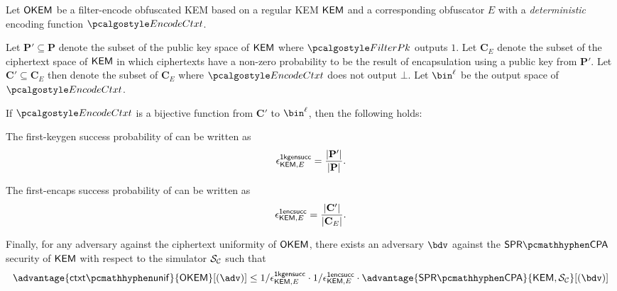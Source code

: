 \begin{lemma}
\label{lem:ctxt-unif-for-bijections}
    Let $\mathsf{OKEM}$ be a filter-encode obfuscated KEM based on a regular KEM $\mathsf{KEM}$ and a corresponding obfuscator $E$ with a \emph{deterministic} encoding function $\encodectxt$.

    Let $\mathbf{P}' \subseteq \mathbf{P}$ denote the subset of the public key space of $\mathsf{KEM}$ where $\filterpk$ outputs $1$.
    Let $ \mathbf{C}_E$ denote the subset of the ciphertext space of $\mathsf{KEM}$ in which ciphertexts have a non-zero probability to be the result of encapsulation using a public key from $\mathbf{P}'$.
    Let $\mathbf{C}' \subseteq \mathbf{C}_E$ then denote the subset of $\mathbf{C}_E$ where $\encodectxt$ does not output $\bot$.
    Let $\bin^\ell$ be the output space of $\encodectxt$.

    If $\encodectxt$ is a bijective function from $\mathbf{C}'$ to $\bin^\ell$, then the following holds:

    The first-keygen success probability of can be written as
    \[
        \epsilon^{\mathsf{1kgensucc}}_{\mathsf{KEM},E} = \frac{|\mathbf{P}'|}{|\mathbf{P}|}.
    \]

    The first-encaps success probability of can be written as
    \[
        \epsilon^{\mathsf{1encsucc}}_{\mathsf{KEM},E} = \frac{|\mathbf{C}'|}{|\mathbf{C}_E|}.
    \]

    Finally, for any adversary against the ciphertext uniformity of $\mathsf{OKEM}$, there exists an adversary $\bdv$ against the $\sprcpa$ security of $\mathsf{KEM}$ with respect to the simulator $\mathcal{S}_\mathcal{C}$ such that
    \[
        \advantage{\ctxtunif}{\OKEM}[(\adv)]
        \leq 1/\epsilon^\firstkeygensuccess_{\KEM,E}
        \cdot 1/\epsilon^\firstencapssuccess_{\KEM,E}
        \cdot \advantage{\sprcpa}{\KEM,\simulunif}[(\bdv)]
    \]
\end{lemma}
